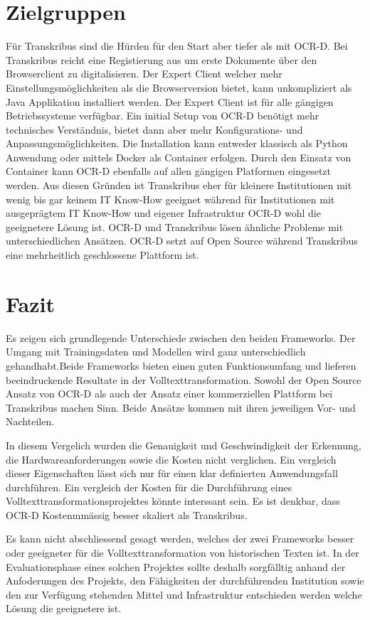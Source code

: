 \documentclass[a4paper,oneside, 12pt]{report}
\begin{document}
\section{Zielgruppen}
Für Transkribus sind die Hürden für den Start aber tiefer als mit OCR-D. Bei Transkribus reicht eine Registierung aus um erste Dokumente über den Browserclient zu digitalisieren. Der Expert Client welcher mehr Einstellungsmöglichkeiten als die Browserversion bietet, kann unkompliziert als Java Applikation installiert werden. Der Expert Client ist für alle gängigen Betriebssysteme verfügbar.
Ein initial Setup von OCR-D benötigt mehr technisches Verständnis, bietet dann aber mehr Konfigurations- und Anpassungsmöglichkeiten. Die Installation kann entweder klassisch als Python Anwendung oder mittels Docker als Container erfolgen. Durch den Einsatz von Container kann OCR-D ebenfalls auf allen gängigen Platformen eingesetzt werden. Aus diesen Gründen ist Transkribus eher für kleinere Institutionen mit wenig bis gar keinem IT Know-How geeignet während für Institutionen mit ausgeprägtem IT Know-How und eigener Infrastruktur OCR-D wohl die geeignetere Lösung ist.
OCR-D und Transkribus lösen ähnliche Probleme mit unterschiedlichen Ansätzen. OCR-D setzt auf Open Source während Transkribus eine mehrheitlich geschlossene Plattform ist.

\section{Fazit}
Es zeigen sich grundlegende Unterschiede zwischen den beiden Frameworks. Der Umgang mit Trainingsdaten und Modellen wird ganz unterschiedlich gehandhabt.Beide Frameworks bieten einen guten Funktionsumfang und lieferen beeindruckende Resultate in der Volltexttransformation. Sowohl der Open Source Ansatz von OCR-D als auch der Ansatz einer kommerziellen Plattform bei Transkribus machen Sinn. Beide Ansätze kommen mit ihren jeweiligen Vor- und Nachteilen. 

In diesem Vergelich wurden die Genauigkeit und Geschwindigkeit der Erkennung, die Hardwareanforderungen sowie die Kosten nicht verglichen. Ein vergleich dieser Eigenschaften lässt sich nur für einen klar definierten Anwendungsfall durchführen. Ein vergleich der Kosten für die Durchführung eines Volltexttransformationsprojektes könnte interssant sein. Es ist denkbar, dass OCR-D Kostenmmässig besser skaliert als Transkribus.

Es kann nicht abschliessend gesagt werden, welches der zwei Frameworks besser oder geeigneter für die Volltexttransformation von historischen Texten ist. In der Evaluationsphase eines solchen Projektes sollte deshalb sorgfälltig anhand der Anfoderungen des Projekts, den Fähigkeiten der durchführenden Institution sowie den zur Verfügung stehenden Mittel und Infrastruktur entschieden werden welche Lösung die geeignetere ist.
\end{document}
